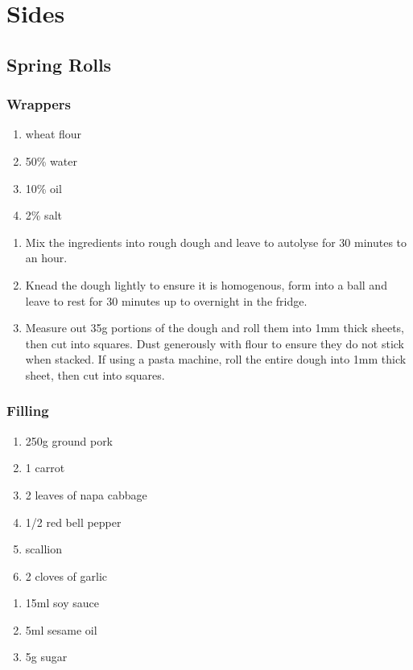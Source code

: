 \chapter{Sides}
\section{Spring Rolls}
\subsection{Wrappers}

\begin{enumerate}
  \item wheat flour
  \item 50\% water
  \item 10\% oil
  \item 2\% salt
\end{enumerate}

\begin{enumerate}
  \item Mix the ingredients into rough dough and leave to autolyse for 30
  minutes to an hour.
  \item Knead the dough lightly to ensure it is homogenous, form into a ball
  and leave to rest for 30 minutes up to overnight in the fridge.
  \item Measure out 35g portions of the dough and roll them into 1mm thick
  sheets, then cut into squares. Dust generously with flour to ensure they do
  not stick when stacked. If using a pasta machine, roll the entire dough into
  1mm thick sheet, then cut into squares.
\end{enumerate}

\subsection{Filling}
\begin{enumerate}
  \item 250g ground pork
  \item 1 carrot
  \item 2 leaves of napa cabbage
  \item 1/2 red bell pepper
  \item scallion
  \item 2 cloves of garlic
\end{enumerate}

\begin{enumerate}
  \item 15ml soy sauce
  \item 5ml sesame oil
  \item 5g sugar
\end{enumerate}


